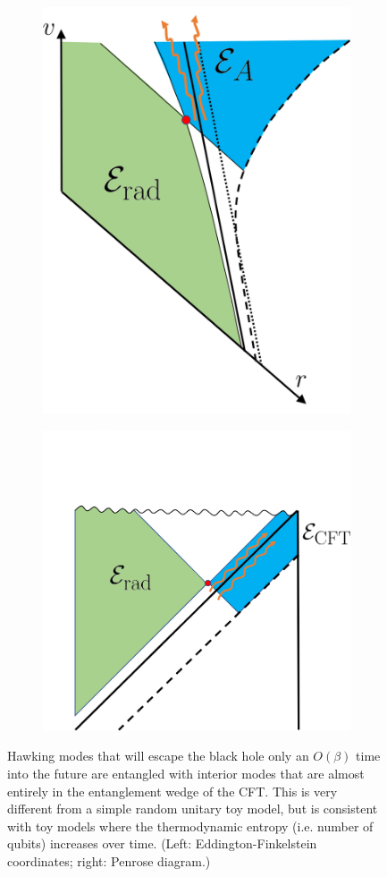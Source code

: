 \documentclass[11pt,a4paper]{article}
\begin{document}
\begin{figure} [t]
\centering
\vspace{0.5cm}
\begin{subfigure}{.48\textwidth}
  \centering
 \includegraphics[width = 0.58\linewidth]{HawkingModes_Late_Eddington.png}
\end{subfigure}
\begin{subfigure}{.48\textwidth}
\vspace{-2cm}
 \includegraphics[width = 0.8\linewidth]{HawkingModes_Late_Penrose.png}
 \centering

\end{subfigure}
\caption{Hawking modes that will escape the black hole only an $O(\beta)$ time into the future are entangled with interior modes that are almost entirely in the entanglement wedge of the CFT. This is very different from a simple random unitary toy model, but is consistent with toy models where the thermodynamic entropy (i.e. number of qubits) increases over time. (Left: Eddington-Finkelstein coordinates; right: Penrose diagram.)}
\label{fig:hawkingmodes_late}
\end{figure}
\end{document}
